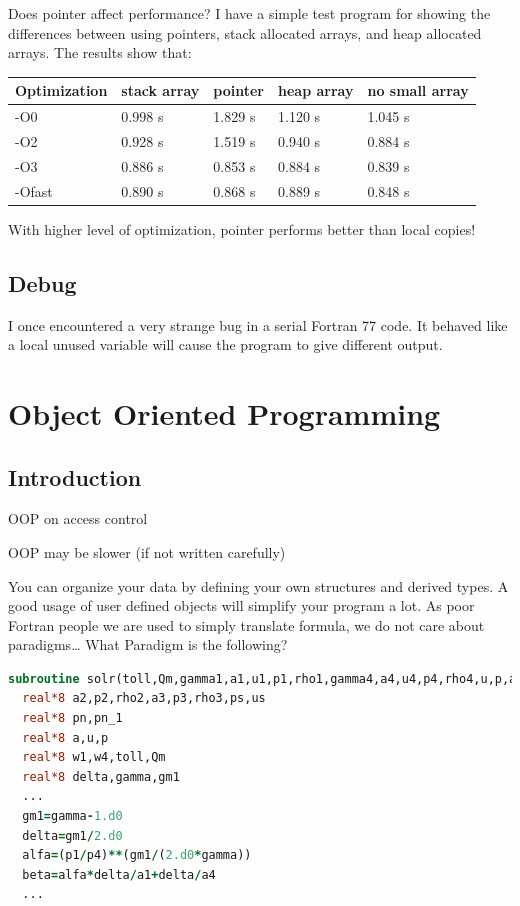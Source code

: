 \documentclass[11pt]{book} %
\begin{document}
Does pointer affect performance? I have a simple test program for showing the differences between using pointers, stack allocated arrays, and heap allocated arrays. The results show that:
\begin{table}[]
\begin{tabular}{lllll}
\hline
Optimization & stack array & pointer & heap array & no small array\\
\hline
-O0          & 0.998 s       & 1.829 s  & 1.120 s  & 1.045 s   \\
-O2          & 0.928 s       & 1.519 s   & 0.940 s  & 0.884 s \\
-O3          & 0.886 s      & 0.853 s   & 0.884 s  & 0.839 s  \\
-Ofast       & 0.890 s       & 0.868 s  & 0.889 s & 0.848 s\\
\hline
\end{tabular}
\end{table}

With higher level of optimization, pointer performs better than local copies!


\section{Debug}

I once encountered a very strange bug in a serial Fortran 77 code. It behaved like a local unused variable will cause the program to give different output.

\chapter{Object Oriented Programming}

\section{Introduction}

OOP on access control

OOP may be slower (if not written carefully)

You can organize your data by defining your own structures and derived types. A good usage of user defined objects will simplify your program a lot.
As poor Fortran people we are used to simply translate formula, we do not care about paradigms… What Paradigm is the following?

\begin{lstlisting}[language=Fortran, caption=Procedural programming style]
subroutine solr(toll,Qm,gamma1,a1,u1,p1,rho1,gamma4,a4,u4,p4,rho4,u,p,a,fF)
  real*8 a2,p2,rho2,a3,p3,rho3,ps,us
  real*8 pn,pn_1
  real*8 a,u,p
  real*8 w1,w4,toll,Qm
  real*8 delta,gamma,gm1
  ...
  gm1=gamma-1.d0
  delta=gm1/2.d0
  alfa=(p1/p4)**(gm1/(2.d0*gamma))
  beta=alfa*delta/a1+delta/a4
  ...
\end{lstlisting}
\end{document}
